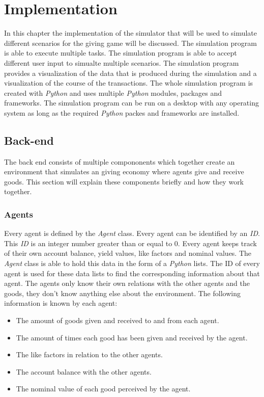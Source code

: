 \documentclass[twoside,openright]{uva-bachelor-thesis}
\begin{document}
\chapter{Implementation}
In this chapter the implementation of the simulator that will be used to simulate different scenarios for the giving game will be discussed. The simulation program is able to execute multiple tasks. The simulation program is able to accept different user input to simualte multiple scenarios. The simulation program provides a visualization of the data that is produced during the simulation and a visualization of the course of the transactions. The whole simulation program is created with \textit{Python} and uses multiple \textit{Python} modules,  packages and frameworks. The simulation program can be run on a desktop with any operating system as long as the required \textit{Python} packes and frameworks are installed. 

\section{Back-end}
The back end consists of multiple compononents which together create an environment that simulates an giving economy where agents give and receive goods. This section will explain these components briefly and how they work together. 

\subsection{Agents}
Every agent is defined by the \textit{Agent} class. Every agent can be identified by an \textit{ID}. This \textit{ID} is an integer number greater than or equal to 0. Every agent keeps track of their own account balance, yield values, like factors and nominal values. The \textit{Agent} class is able to hold this data in the form of a \textit{Python} lists. The ID of every agent is used for these data lists to find the corresponding information about that agent. The agents only know their own relations with the other agents and the goods, they don't know anything else about the environment. The following information is known by each agent:
\begin{itemize}
\item The amount of goods given and received to and from each agent.
\item The amount of times each good has been given and received by the agent.
\item The like factors in relation to the other agents.
\item The account balance with the other agents.
\item The nominal value of each good perceived by the agent.
\end{itemize}
\end{document}
